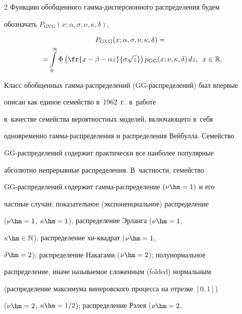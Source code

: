\begin{multicols}{2}
Функцию обобщенного гам\-ма-дис\-пер\-си\-он\-но\-го распределения будем


обозначать $P_{\mathrm{GVG}}(x;\alpha,\sigma,\nu,\kappa,\delta)$,


\begin{multline}


P_{\mathrm{GVG}}(x;\alpha,\sigma,\nu,\kappa,\delta)={}\\


\hspace*{-2mm}{}=


\int\limits_{0}^{\infty}\Phi\left(\fr{x-\beta-\alpha


z}{\sigma\sqrt{z}}\right)p_{\mathrm{GG}}(x;\nu,\kappa,\delta)\,dz,\enskip


x\in\mathbb{R}.\!\!\!\!


\label{e3-kk}


\end{multline}





Класс обобщенных гамма-рас\-пре\-де\-ле\-ний (GG-рас\-пре\-де\-ле\-ний) был впервые


описан как единое семейство в~1962~г.\ в~работе~\cite{Stacy1962} 


в~качестве семейства вероятностных моделей, включающего в~себя


одновременно гам\-ма-рас\-пре\-де\-ле\-ния и распределения Вейбулла. Семейство


GG-рас\-пре\-де\-ле\-ний содержит практически все наиболее популярные


абсолютно непрерывные распределения. В~частности, семейство


GG-рас\-пре\-де\-ле\-ний содержит гам\-ма-рас\-пре\-де\-ле\-ние $(\nu\hm=1)$ и его


частные случаи: показательное (экспоненциальное) распределение


($\nu\hm=1$, $\kappa\hm=1$), распределение Эрланга ($\nu\hm=1$,


$\kappa\hm\in\mathbb{N}$), распределение хи-квад\-рат ($\nu\hm=1$,


$\delta\hm=2$); распределение Накагами ($\nu\hm=2$); полунормальное


распределение, иначе называемое сложенным (folded) нормальным


(распределение максимума винеровского процесса на отрезке $[0,1]$)


($\nu\hm=2$, $\kappa\hm=1/2$); распределение Рэлея ($\nu\hm=2$,



\end{multicols}
